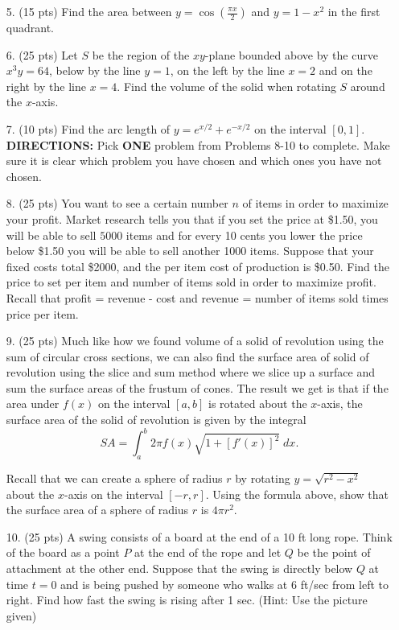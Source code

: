 \documentclass[11pt,reqno]{article}
\theoremstyle{definition}
\begin{document}
\begin{enumerate}
\begin{enumerate}
		\end{enumerate}
		\newpage
		\item[5.] (15 pts) Find the area between $y = \cos\left(\frac{\pi x}{2}\right)$ and $y = 1 - x^2$ in the first quadrant. 
		\newpage
		\item[6.] (25 pts) Let $S$ be the region of the $xy$-plane bounded above by the curve $x^3y = 64$, below by the line $y = 1$, on the left by the line $x = 2$ and on the right by the line $x = 4$. Find the volume of the solid when rotating $S$ around the $x$-axis. 
		\newpage
		\item[7.] (10 pts) Find the arc length of $y = e^{x/2} + e^{-x/2}$ on the interval $[0, 1]$. 
		\newpage
		\textbf{DIRECTIONS:} Pick \textbf{ONE} problem from Problems 8-10 to complete. Make sure it is clear which problem you have chosen and which ones you have not chosen. 
		\item[8.] (25 pts) You want to see a certain number $n$ of items in order to maximize your profit. Market research tells you that if you set the price at \$1.50, you will be able to sell $5000$ items and for every 10 cents you lower the price below \$1.50 you will be able to sell another 1000 items. Suppose that your fixed costs total \$2000, and the per item cost of production is \$0.50. Find the price to set per item and number of items sold in order to maximize profit. Recall that profit = revenue - cost and revenue = number of items sold times price per item.
		\newpage
		\item[9.] (25 pts) Much like how we found volume of a solid of revolution using the sum of circular cross sections, we can also find the surface area of solid of revolution using the slice and sum method where we slice up a surface and sum the surface areas of the frustum of cones. The result we get is that if the area under $f(x)$ on the interval $[a, b]$ is rotated about the $x$-axis, the surface area of the solid of revolution is given by the integral 
		$$ SA = \int_{a}^{b} 2\pi f(x) \sqrt{1 + [f'(x)]^2} \; dx.$$
		
		Recall that we can create a sphere of radius $r$ by rotating $y = \sqrt{r^2 - x^2}$ about the $x$-axis on the interval $[-r, r]$. Using the formula above, show that the surface area of a sphere of radius $r$ is $4 \pi r^2$. 
		\newpage
		\item[10.] (25 pts) A swing consists of a board at the end of a 10 ft long rope. Think of the board as a point $P$ at the end of the rope and let $Q$ be the point of attachment at the other end. Suppose that the swing is directly below $Q$ at time $t = 0$ and is being pushed by someone who walks at 6 ft/sec from left to right. Find how fast the swing is rising after 1 sec. (Hint: Use the picture given) 
		

\end{enumerate}
\end{document}
